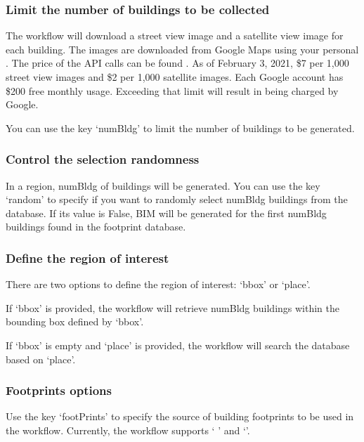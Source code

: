 \documentclass[letterpaper,10pt,english]{sphinxmanual}
\begin{document}
\subsubsection{Limit the number of buildings to be collected}
\label{\detokenize{common/user_manual/workflow:limit-the-number-of-buildings-to-be-collected}}\label{\detokenize{common/user_manual/workflow:limitthenumber}}
\sphinxAtStartPar
The workflow will download a street view image and a satellite view image for each building.
The images are downloaded from Google Maps using  your personal .
The price of the API calls can be found .
As of February 3, 2021, \$7 per 1,000 street view images and \$2 per 1,000 satellite images.
Each Google account has \$200 free monthly usage. Exceeding that limit will result in being charged by Google.

\sphinxAtStartPar
You can use the key ‘numBldg’ to limit the number of buildings to be generated.


\subsubsection{Control the selection randomness}
\label{\detokenize{common/user_manual/workflow:control-the-selection-randomness}}
\sphinxAtStartPar
In a region, numBldg of buildings will be generated.
You can use the key ‘random’ to specify if you want to randomly select numBldg buildings from the database.
If its value is False, BIM will be generated for the first numBldg buildings found in the footprint database.


\subsubsection{Define the region of interest}
\label{\detokenize{common/user_manual/workflow:define-the-region-of-interest}}
\sphinxAtStartPar
There are two options to define the region of interest: ‘bbox’ or ‘place’.

\sphinxAtStartPar
If ‘bbox’ is provided, the workflow will retrieve numBldg buildings within the bounding box defined by ‘bbox’.

\sphinxAtStartPar
If ‘bbox’ is empty and ‘place’ is provided, the workflow will search the database based on ‘place’.


\subsubsection{Footprints options}
\label{\detokenize{common/user_manual/workflow:footprints-options}}
\sphinxAtStartPar
Use the key ‘footPrints’ to specify the source of building footprints to be used in the workflow.
Currently, the workflow supports ‘
’ and ‘’.
\end{document}
